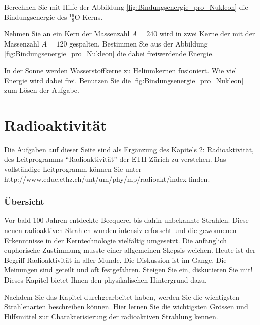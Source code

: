 \documentclass[12pt,a4paper,twoside]{article}
\newcommand{\Kern}[3]{$^{#1}_{\phantom{1}#2}\text{#3}$}
\begin{document}
\begin{aufgabe}
	Berechnen Sie mit Hilfe der Abbildung \ref{fig:Bindungsenergie_pro_Nukleon} die Bindungsenergie des \Kern{16}{8}{O} Kerns.
\end{aufgabe}


\begin{aufgabe}
	Nehmen Sie an ein Kern der Massenzahl $A=240$ wird in zwei Kerne der mit der Massenzahl $A=120$ gespalten. 
	Bestimmen Sie aus der Abbildung \ref{fig:Bindungsenergie_pro_Nukleon} die dabei	freiwerdende Energie.
\end{aufgabe}

\begin{aufgabe}
	In der Sonne werden Wasserstoffkerne zu Heliumkernen fusioniert.
	Wie viel Energie wird dabei frei. Benutzen Sie die \ref{fig:Bindungsenergie_pro_Nukleon} zum Lösen der Aufgabe.
\end{aufgabe}

\newpage

\section*{Radioaktivität}

Die Aufgaben auf dieser Seite sind als Ergänzung des Kapitels 2: Radioaktivität, des Leitprogramms ``Radioaktivität'' der ETH Zürich zu verstehen.
Das vollständige Leitprogramm können Sie unter http://www.educ.ethz.ch/unt/um/phy/mp/radioakt/index finden.


\subsubsection*{Übersicht}
Vor bald 100 Jahren entdeckte Becquerel bis dahin unbekannte Strahlen. Diese neuen {\quotedblbase}radioaktiven{\quotedblbase} Strahlen wurden intensiv erforscht und die gewonnenen Erkenntnisse in der Kerntechnologie vielfältig umgesetzt. Die anfänglich euphorische Zustimmung musste einer allgemeinen Skepsis weichen. Heute ist der Begriff {\quotedblbase}Radioaktivität{\quotedblbase} in aller Munde. Die Diskussion ist im Gange. Die Meinungen sind geteilt und oft festgefahren. Steigen Sie ein, diskutieren Sie mit! Dieses Kapitel bietet Ihnen den physikalischen Hintergrund dazu.

Nachdem Sie das Kapitel durchgearbeitet haben, werden Sie die wichtigsten Strahlenarten beschreiben können. Hier lernen Sie die wichtigsten Grössen und Hilfsmittel zur Charakterisierung der radioaktiven Strahlung kennen.
\end{document}
